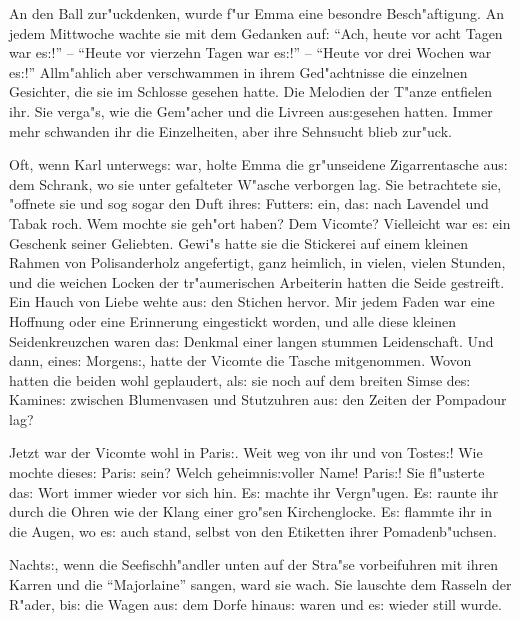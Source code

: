 \documentclass[oneside,12pt]{book}
\newcommand{\s}{s:}%
\begin{document}
An den Ball zur"uckdenken, wurde f"ur Emma eine besondre
Besch"aftigung. An jedem Mittwoche wachte sie mit dem Gedanken
auf: "`Ach, heute vor acht Tagen war e{\s}!"' -- "`Heute vor
vierzehn Tagen war e{\s}!"' -- "`Heute vor drei Wochen war
e{\s}!"' Allm"ahlich aber verschwammen in ihrem Ged"achtnisse die
einzelnen Gesichter, die sie im Schlosse gesehen hatte. Die
Melodien der T"anze entfielen ihr. Sie verga"s, wie die Gem"acher
und die Livreen au{\s}gesehen hatten. Immer mehr schwanden ihr die
Einzelheiten, aber ihre Sehnsucht blieb zur"uck.


\newpage\begin{center}
{\large \so{Neunte{\s} Kapitel}}\bigskip\bigskip
\end{center}

Oft, wenn Karl unterweg{\s} war, holte Emma die gr"unseidene
Zigarrentasche au{\s} dem Schrank, wo sie unter gefalteter W"asche
verborgen lag. Sie betrachtete sie, "offnete sie und sog sogar den
Duft ihre{\s} Futter{\s} ein, da{\s} nach Lavendel und Tabak roch.
Wem mochte sie geh"ort haben? Dem Vicomte? Vielleicht war e{\s}
ein Geschenk seiner Geliebten. Gewi"s hatte sie die Stickerei auf
einem kleinen Rahmen von Polisanderholz angefertigt, ganz
heimlich, in vielen, vielen Stunden, und die weichen Locken der
tr"aumerischen Arbeiterin hatten die Seide gestreift. Ein Hauch
von Liebe wehte au{\s} den Stichen hervor. Mir jedem Faden war
eine Hoffnung oder eine Erinnerung eingestickt worden, und alle
diese kleinen Seidenkreuzchen waren da{\s} Denkmal einer langen
stummen Leidenschaft. Und dann, eine{\s} Morgen{\s}, hatte der
Vicomte die Tasche mitgenommen. Wovon hatten die beiden wohl
geplaudert, al{\s} sie noch auf dem breiten Simse de{\s}
Kamine{\s} zwischen Blumenvasen und Stutzuhren au{\s} den Zeiten
der Pompadour lag?

Jetzt war der Vicomte wohl in Pari{\s}. Weit weg von ihr und von
Toste{\s}! Wie mochte diese{\s} Pari{\s} sein? Welch
geheimni{\s}voller Name! Pari{\s}! Sie fl"usterte da{\s} Wort
immer wieder vor sich hin. E{\s} machte ihr Vergn"ugen. E{\s}
raunte ihr durch die Ohren wie der Klang einer gro"sen
Kirchenglocke. E{\s} flammte ihr in die Augen, wo e{\s} auch
stand, selbst von den Etiketten ihrer Pomadenb"uchsen.

Nacht{\s}, wenn die Seefischh"andler unten auf der Stra"se
vorbeifuhren mit ihren Karren und die "`Majorlaine"' sangen, ward
sie wach. Sie lauschte dem Rasseln der R"ader, bi{\s} die Wagen
au{\s} dem Dorfe hinau{\s} waren und e{\s} wieder still wurde.
\end{document}
